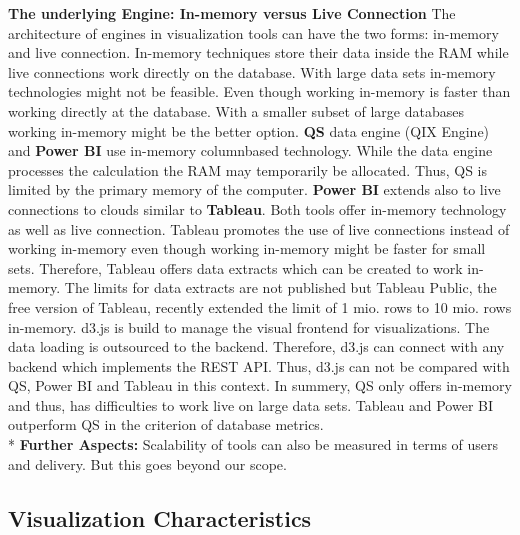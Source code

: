 \textbf{The underlying Engine: In-memory versus Live Connection}
The architecture of engines in visualization tools can have the two forms: in-memory and live connection.
In-memory techniques store their data inside the RAM while live connections work directly on the database. 
With large data sets in-memory technologies might not be feasible. Even though working in-memory is faster than working directly at the database. With a smaller subset of large databases working in-memory might be the better option. 
\textbf{QS} data engine (QIX Engine) and \textbf{Power BI} use in-memory columnbased technology. While the data engine processes the calculation the RAM may temporarily be allocated. Thus, QS is limited by the primary memory of the computer. \textbf{Power BI} extends also to live connections to clouds similar to \textbf{Tableau}. Both tools offer in-memory technology as well as live connection. Tableau promotes the use of live connections instead of working in-memory even though working in-memory might be faster for small sets. Therefore, Tableau offers data extracts which can be created to work in-memory. The limits for data extracts are not published but Tableau Public, the free version of Tableau, recently extended the limit of 1 mio. rows to 10 mio. rows in-memory. 
d3.js is build to manage the visual frontend for visualizations. The data loading is outsourced to the backend. Therefore, d3.js can connect with any backend which implements the REST API. Thus, d3.js can not be compared with QS, Power BI and Tableau in this context. 
In summery, QS only offers in-memory and thus, has difficulties to work live on large data sets. Tableau and Power BI outperform QS in the criterion of database metrics.\\*
\textbf{Further Aspects: }
Scalability of tools can also be measured in terms of users and delivery. But this goes beyond our scope.


\subsection{Visualization Characteristics}

